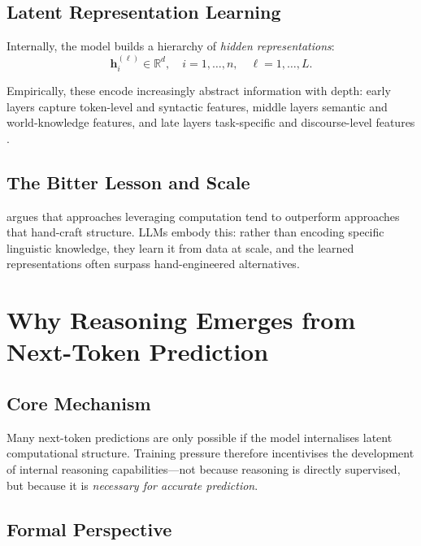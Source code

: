 \documentclass[11pt,a4paper]{article}
\theoremstyle{definition}
\theoremstyle{plain}
\newcommand{\R}{\mathbb{R}}
\begin{document}
\subsection{Latent Representation Learning}

Internally, the model builds a hierarchy of \emph{hidden representations}:
\[
  \mathbf{h}_i^{(\ell)} \in \R^d, \quad i = 1, \dots, n, \quad \ell = 1, \dots, L.
\]

Empirically, these encode increasingly abstract information with depth:
early layers capture token-level and syntactic features, middle layers
semantic and world-knowledge features, and late layers task-specific and
discourse-level features \cite{tenney2019bert, elhage2021mathematical}.

\subsection{The Bitter Lesson and Scale}

\citet{sutton2019bitter} argues that approaches leveraging computation
tend to outperform approaches that hand-craft structure.
LLMs embody this: rather than encoding specific linguistic knowledge,
they learn it from data at scale, and the learned representations often
surpass hand-engineered alternatives.

\section{Why Reasoning Emerges from Next-Token Prediction}

\subsection{Core Mechanism}

\begin{keyresult}
Many next-token predictions are only possible if the model internalises
latent computational structure. Training pressure therefore incentivises the
development of internal reasoning capabilities---not because reasoning is
directly supervised, but because it is \emph{necessary for accurate prediction}.
\end{keyresult}

\subsection{Formal Perspective}
\end{document}
